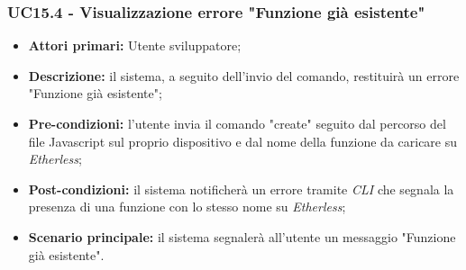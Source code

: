 \subsubsection{UC15.4 - Visualizzazione errore "Funzione già esistente"}
\begin{itemize}
	\item \textbf{Attori primari:} Utente sviluppatore;
	\item \textbf{Descrizione:} il sistema, a seguito dell'invio del comando, restituirà un errore "Funzione già esistente";
	\item \textbf{Pre-condizioni:}  l'utente invia il comando "create" seguito dal percorso del file Javascript sul proprio dispositivo e dal nome della funzione da caricare su \textit{Etherless};
	\item \textbf{Post-condizioni:} il sistema notificherà un errore tramite \textit{CLI\glo} che segnala la presenza di una funzione con lo stesso nome su \textit{Etherless};
	\item \textbf{Scenario principale:} il sistema segnalerà all'utente un messaggio "Funzione già esistente".
\end{itemize}